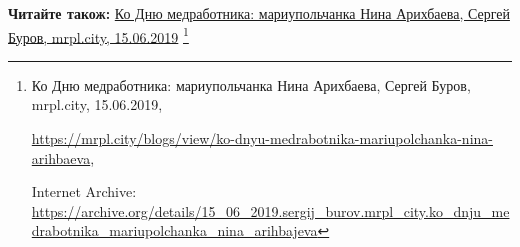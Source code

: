  
 
 
 
 

\def\pubIA{https://archive.org/details/15_06_2019.sergij_burov.mrpl_city.ko_dnju_medrabotnika_mariupolchanka_nina_arihbajeva}
\def\pubTitle{Ко Дню медработника: мариупольчанка Нина Арихбаева}
\def\pubDate{15.06.2019}
\def\pubOrigin{https://mrpl.city/blogs/view/ko-dnyu-medrabotnika-mariupolchanka-nina-arihbaeva}
\def\pubAuthor{Сергей Буров}

\textbf{Читайте також:} \href{\pubIA}{%
\pubTitle, \pubAuthor, mrpl.city, \pubDate}%
\footnote{\pubTitle, \pubAuthor, mrpl.city, \pubDate, \par\url{\pubOrigin}, \par Internet Archive: \url{\pubIA}}
